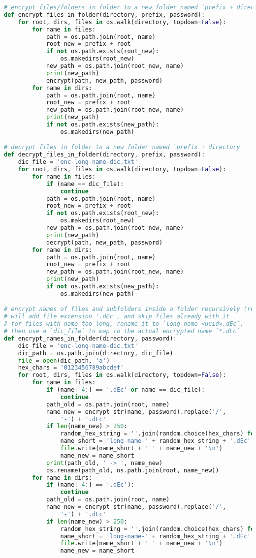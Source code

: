 \begin{lstlisting}[language=python,caption=encrypt.py]
# encrypt files/folders in folder to a new folder named `prefix + directory`
def encrypt_files_in_folder(directory, prefix, password):
	for root, dirs, files in os.walk(directory, topdown=False):
		for name in files:
			path = os.path.join(root, name)
			root_new = prefix + root
			if not os.path.exists(root_new):
				os.makedirs(root_new)
			new_path = os.path.join(root_new, name)
			print(new_path)
			encrypt(path, new_path, password)
		for name in dirs:
			path = os.path.join(root, name)
			root_new = prefix + root
			new_path = os.path.join(root_new, name)
			print(new_path)
			if not os.path.exists(new_path):
				os.makedirs(new_path)

# decrypt files in folder to a new folder named `prefix + directory`
def decrypt_files_in_folder(directory, prefix, password):
	dic_file = 'enc-long-name-dic.txt'
	for root, dirs, files in os.walk(directory, topdown=False):
		for name in files:
			if (name == dic_file):
				continue
			path = os.path.join(root, name)
			root_new = prefix + root
			if not os.path.exists(root_new):
				os.makedirs(root_new)
			new_path = os.path.join(root_new, name)
			print(new_path)
			decrypt(path, new_path, password)
		for name in dirs:
			path = os.path.join(root, name)
			root_new = prefix + root
			new_path = os.path.join(root_new, name)
			print(new_path)
			if not os.path.exists(new_path):
				os.makedirs(new_path)

# encrypt names of files and subfolders inside a folder recursively (rename)
# will add file extension '.dEc', and skip files already with it
# for files with name too long, rename it to `long-name-<uuid>.dEc`,
# then use a `dic_file` to map to the actual encrypted name `*.dEc`
def encrypt_names_in_folder(directory, password):
	dic_file = 'enc-long-name-dic.txt'
	dic_path = os.path.join(directory, dic_file)
	file = open(dic_path, 'a')
	hex_chars = '0123456789abcdef'
	for root, dirs, files in os.walk(directory, topdown=False):
		for name in files:
			if (name[-4:] == '.dEc' or name == dic_file):
				continue
			path_old = os.path.join(root, name)
			name_new = encrypt_str(name, password).replace('/',
				'-') + '.dEc'
			if len(name_new) > 250:
				random_hex_string = ''.join(random.choice(hex_chars) for _ in range(32))
				name_short = 'long-name-' + random_hex_string + '.dEc'
				file.write(name_short + ' ' + name_new + '\n')
				name_new = name_short
			print(path_old, ' -> ', name_new)
			os.rename(path_old, os.path.join(root, name_new))
		for name in dirs:
			if (name[-4:] == '.dEc'):
				continue
			path_old = os.path.join(root, name)
			name_new = encrypt_str(name, password).replace('/',
				'-') + '.dEc'
			if len(name_new) > 250:
				random_hex_string = ''.join(random.choice(hex_chars) for _ in range(32))
				name_short = 'long-name-' + random_hex_string + '.dEc'
				file.write(name_short + ' ' + name_new + '\n')
				name_new = name_short
				

\end{lstlisting}

